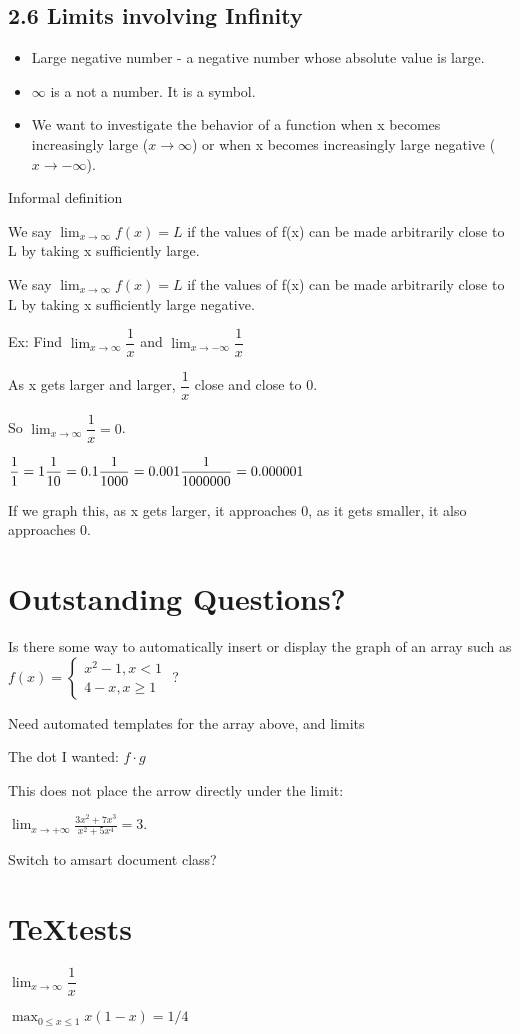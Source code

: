 \documentclass[12pt]{article}
\begin{document}
\subsection{2.6 Limits involving Infinity}
\begin{itemize}
\item Large negative number - a negative number whose absolute value is large.
\item $\infty$ is a not a number. It is a symbol.
\item We want to investigate the behavior of a function when x becomes increasingly large ($x \to \infty$) or when
  x becomes increasingly large negative ($x \to -\infty$).
\end{itemize}

Informal definition

We say $\lim_{x\to\infty} f(x) = L$ if the values of f(x) can be made arbitrarily close to L by taking x
sufficiently large.

We say $\lim_{x\to\infty}f(x)=L$ if the values of f(x) can be made arbitrarily close to L by taking x
sufficiently large negative.

Ex: Find $\lim_{x\to\infty}\dfrac{1}{x}$ and $\lim_{x\to -\infty}\dfrac{1}{x}$

As x gets larger and larger, $\dfrac{1}{x}$ close and close to 0.

So $\lim_{x\to\infty}\dfrac{1}{x}=0$.

$
\dfrac{1}{1} = 1\\
\dfrac{1}{10}= 0.1\\
\dfrac{1}{1000}=0.001\\
\dfrac{1}{1000000}=0.000001
$

If we graph this, as x gets larger, it approaches 0, as it gets smaller, it also approaches 0.

\section{Outstanding Questions?}

Is there some way to automatically insert or display the graph of an array such as $f(x) = \left\{\begin{array}{l}
x^2-1,x < 1\\
4-x, x \geq 1
\end{array} \right. $ ?

Need automated templates for the array above, and limits

The dot I wanted: $f\cdot g$

This does not place the arrow directly under the limit:


$ \lim_{x \to +\infty} \frac{3x^2 +7x^3}{x^2 +5x^4} = 3. $


Switch to amsart document class?

\section{\TeX tests}

$\lim_{x\to\infty}\dfrac{1}{x}$

 $\max_{0\le x\le 1}x(1-x)=1/4$
\end{document}
